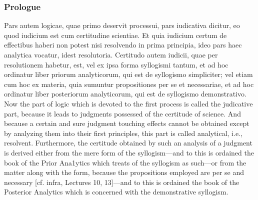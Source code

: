 \subsubsection{Prologue}
Pars autem logicae, quae primo deservit processui, pars iudicativa dicitur, eo quod iudicium est cum certitudine scientiae. Et quia iudicium certum de effectibus haberi non potest nisi resolvendo in prima principia, ideo pars haec analytica vocatur, idest resolutoria. Certitudo autem iudicii, quae per resolutionem habetur, est, vel ex ipsa forma syllogismi tantum, et ad hoc ordinatur liber priorum analyticorum, qui est de syllogismo simpliciter; vel etiam cum hoc ex materia, quia sumuntur propositiones per se et necessariae, et ad hoc ordinatur liber posteriorum analyticorum, qui est de syllogismo demonstrativo.	Now the part of logic which is devoted to the first process is called the judicative part, because it leads to judgments possessed of the certitude of science. And because a certain and sure judgment touching effects cannot be obtained except by analyzing them into their first principles, this part is called analytical, i.e., resolvent. Furthermore, the certitude obtained by such an analysis of a judgment is derived either from the mere form of the syllogism—and to this is ordained the book of the Prior Ana1ytics which treats of the syllogism as such—or from the matter along with the form, because the propositions employed are per se and necessary [cf. infra, Lectures 10, 13]—and to this is ordained the book of the Posterior Analytics which is concerned with the demonstrative syllogism.
